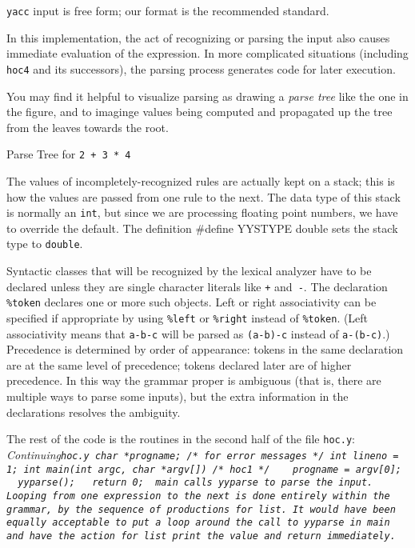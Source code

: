 {{\tt yacc} input is free form; our format is the recommended standard.

In this implementation, the act of recognizing or parsing the input
also causes immediate evaluation of the expression. In more
complicated situations (including {\tt hoc4} and its successors),
the parsing process generates code for later execution.

You may find it helpful to visualize parsing as drawing a
{\it parse tree\/} like the one in the figure, and to imaginge
values being computed and propagated up the tree from the leaves
towards the root.
\medskip
\centerline{}
\centerline{Parse Tree for {\tt 2 + 3 * 4}}
\medskip
\noindent
The values of incompletely-recognized rules are actually kept
on a stack; this is how the values are passed from one rule
to the next. The data type of this stack is normally an {\tt int},
but since we are processing floating point numbers, we have to
override the default. The definition
\medskip\begincode
#define YYSTYPE double
\endcode\medskip\noindent
sets the stack type to {\tt double}.

Syntactic classes that will be recognized by the lexical analyzer
have to be declared unless they are single character literals like
{\tt+} and~{\tt-}. The declaration {\tt\%token} declares one or
more such objects. Left or right associativity can be specified
if appropriate by using {\tt\%left} or {\tt\%right} instead of
{\tt\%token}. (Left associativity means that {\tt a-b-c} will
be parsed as {\tt(a-b)-c} instead of {\tt a-(b-c)}.)
Precedence is determined by order of appearance: tokens
in the same declaration are at the same level of precedence;
tokens declared later are of higher precedence. In this way
the grammar proper is ambiguous (that is, there are multiple
ways to parse some inputs), but the extra information in the
declarations resolves the ambiguity.

The rest of the code is the routines in the second half of the
file {\tt hoc.y}:
\medskip
\begincode
~                       \it Continuing\/\tt hoc.y
char    *progname;       /* for error messages */
int     lineno = 1;
\medskip
int main(int argc, char *argv[])   /* hoc1 */
{
~       progname = argv[0];
~       yyparse();
~       return 0;
}
\endcode
\medskip
\noindent
{\tt main} calls {\tt yyparse} to parse the input. Looping from
one expression to the next is done entirely within the grammar,
by the sequence of productions for {\tt list}. It would have been
equally acceptable to put a loop around the call to {\tt yyparse}
in {\tt main} and have the action for {\tt list} print the value
and return immediately.

}
